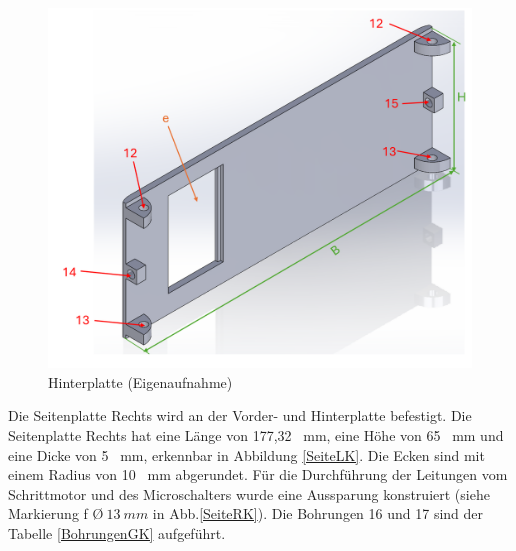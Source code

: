 \begin{figure}[H]
	\begin{center}
		\includegraphics[width=\textwidth]{Images/Konstruktion/HinterK.png}
		\caption{Hinterplatte (Eigenaufnahme)} \label{HinterK}
	\end{center}
\end{figure}

Die Seitenplatte Rechts wird an der Vorder- und Hinterplatte befestigt. Die Seitenplatte Rechts hat eine Länge von 177,32 \ mm, eine Höhe von 65 \ mm und eine Dicke von 5 \ mm, erkennbar in Abbildung \ref{SeiteLK}. Die Ecken sind mit einem Radius von 10 \ mm abgerundet. Für die Durchführung der Leitungen vom Schrittmotor und des Microschalters wurde eine Aussparung konstruiert (siehe Markierung f \O $ \ 13 \ mm$  in Abb.\ref{SeiteRK}). Die Bohrungen 16 und 17 sind der Tabelle \ref{BohrungenGK} aufgeführt. 


